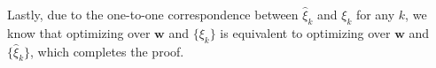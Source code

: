 \documentclass[10pt,journal,compsoc]{newIEEEtran}
\newenvironment{proof}[1][Proof]{\begin{trivlist}
		\item[\hskip \labelsep {\bfseries #1}]}{\end{trivlist}}
\newcommand{\qed}{\nobreak \ifvmode \relax \else
	\ifdim\lastskip<1.5em \hskip-\lastskip
	\hskip1.5em plus0em minus0.5em \fi \nobreak
	\vrule height0.75em width0.5em depth0.25em\fi}
\begin{document}
\begin{proof}[Proof of Theorem \ref{THM:2COEQ}]
	Lastly, due to the one-to-one correspondence between $\hat{\xi}_k$ and $\xi_k$ for any $k$, we know that optimizing over $\mathbf{w}$ and $\{\xi_k\}$ is equivalent to optimizing over $\mathbf{w}$ and $\{\hat{\xi}_k\}$, which completes the proof. \qed
\end{proof}%

%
%

{
	
	
}



\end{document}
